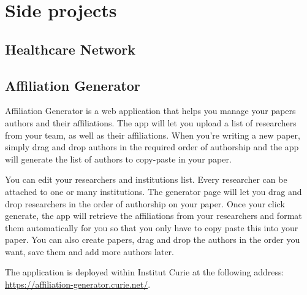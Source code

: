 \chapter{Side projects}

\section{Healthcare Network}

\section{Affiliation Generator}

Affiliation Generator is a web application that helps you manage your papers authors and their affiliations. The app will let you upload a list of researchers from your team, as well as their affiliations. When you're writing a new paper, simply drag and drop authors in the required order of authorship and the app will generate the list of authors to copy-paste in your paper.

You can edit your researchers and institutions list. Every researcher can be attached to one or many institutions. The generator page will let you drag and drop researchers in the order of authorship on your paper. Once your click generate, the app will retrieve the affiliations from your researchers and format them automatically for you so that you only have to copy paste this into your paper. You can also create papers, drag and drop the authors in the order you want, save them and add more authors later.

The application is deployed within Institut Curie at the following address:
\url{https://affiliation-generator.curie.net/}.
